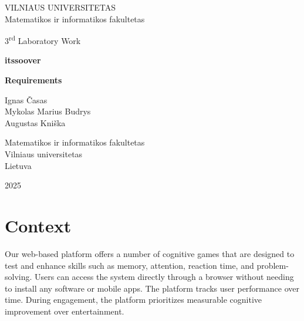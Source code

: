 \documentclass[11pt,a4paper]{article}
\begin{document}

\begin{titlepage}
    \centering
    \thispagestyle{empty}
    
    {\Large VILNIAUS UNIVERSITETAS\\
    Matematikos ir informatikos fakultetas}\par
    
    \vspace{3cm} %
    
    {\Large 3\textsuperscript{rd} Laboratory Work}\par
    \vspace{0.5cm}
    {\Large \textbf{itssoover}}\par
    {\Large \textbf{Requirements}}\par
    
    \vspace{3cm}
    
    {\large
    Ignas Časas\\
    Mykolas Marius Budrys\\
    Augustas Kniška
    }\par
    
    \vspace{8cm}
    
    {\large
    Matematikos ir informatikos fakultetas\\
    Vilniaus universitetas\\
    Lietuva
    }\par
    
    \vfill

    \large 2025
    
\end{titlepage}

\tableofcontents
\newpage

\section{Context}
Our web-based platform offers a number of cognitive games that are designed to test and enhance skills such as memory, attention, reaction time, and problem-solving. Users can access the system directly through a browser without needing to install any software or mobile apps. The platform tracks user performance over time. During engagement, the platform prioritizes measurable cognitive improvement over entertainment.
\end{document}

